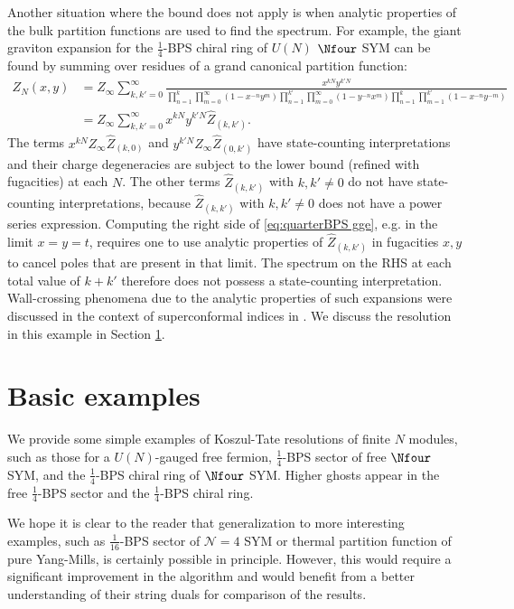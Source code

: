 \documentclass[a4paper,12pt]{article}
\begin{document}
Another situation where the bound does not apply is when analytic properties of the bulk partition functions are used to find the spectrum. For example, the giant graviton expansion for the $\frac{1}{4}$-BPS chiral ring of $U(N)$ $\Nfour$ SYM can be found by summing over residues of a grand canonical partition function:
\begin{align} \label{eq:quarterBPS gge}
    Z_N(x,y) &= Z_\infty \sum_{k,k' = 0}^\infty \frac{x^{k N} y^{k' N}}{\prod_{n=1}^{k} \prod_{m=0}^{\infty} (1 - x^{-n} y^m) \prod_{n=1}^{k'} \prod_{m=0}^{\infty} (1 - y^{-n} x^m) \prod_{n=1}^{k} \prod_{m=1}^{k'} (1 - x^{-n} y^{-m})} \nonumber \\
    &= Z_\infty \sum_{k,k' = 0}^\infty x^{k N} y^{k' N} \hat{Z}_{(k,k')}.
\end{align}
The terms $x^{k N} Z_\infty \hat{Z}_{(k,0)}$ and $y^{k' N} Z_\infty \hat{Z}_{(0,k')}$ have state-counting interpretations and their charge degeneracies are subject to the lower bound (refined with fugacities) at each $N$. The other terms $\hat{Z}_{(k,k')}$ with $k, k' \neq 0$ do not have state-counting interpretations, because $\hat{Z}_{(k,k')}$ with $k, k' \neq 0$ does not have a power series expression. Computing the right side of \eqref{eq:quarterBPS gge}, e.g. in the limit $x=y=t$, requires one to use analytic properties of $\hat{Z}_{(k,k')}$ in fugacities $x, y$ to cancel poles that are present in that limit. The spectrum on the RHS at each total value of $k+k'$ therefore does not possess a state-counting interpretation. Wall-crossing phenomena due to the analytic properties of such expansions were discussed in the context of superconformal indices in \cite{Lee:2022vig}. We discuss the resolution in this example in Section \ref{sec:basicexamples}.




\section{Basic examples} \label{sec:basicexamples}

We provide some simple examples of Koszul-Tate resolutions of finite $N$ modules, such as those for a $U(N)$-gauged free fermion, $\frac{1}{4}$-BPS sector of free $\Nfour$ SYM, and the $\frac{1}{4}$-BPS chiral ring of $\Nfour$ SYM. Higher ghosts appear in the free $\frac{1}{4}$-BPS sector and the $\frac{1}{4}$-BPS chiral ring.

We hope it is clear to the reader that generalization to more interesting examples, such as $\frac{1}{16}$-BPS sector of $\mathcal{N}=4$ SYM or thermal partition function of pure Yang-Mills, is certainly possible in principle. However, this would require a significant improvement in the algorithm and would benefit from a better understanding of their string duals for comparison of the results.
\end{document}
